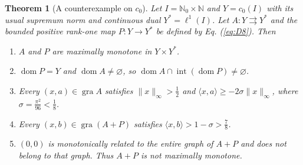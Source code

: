 \documentclass[11pt]{article}
\newcommand{\N}{\mathbb N}
\newcommand{\Nzero}{\mathbb N_0}
\newcommand{\gra}{\operatorname{gra}}
\newcommand{\dom}{\operatorname{dom}}
\newcommand{\pair}[2]{\langle #1,#2\rangle}
\newtheorem{theorem}{Theorem}
\theoremstyle{definition}
\theoremstyle{remark}
\begin{document}
\begin{theorem}[A counterexample on $c_0$]\label{thm:C}
Let $I=\Nzero\times\N$ and $Y=c_0(I)$ with its usual supremum norm and continuous dual $Y^*=\ell^1(I)$. Let $A:Y\rightrightarrows Y^*$ and the bounded positive rank-one map $P:Y\to Y^*$ be defined by Eq. (\ref{eq:D8}). Then 
\begin{enumerate}
\item\label{thm:C-maximality} $A$ and $P$ are maximally monotone in $Y\times Y^*$.
\item\label{thm:C-domain} $\dom P=Y$ and $\dom A\ne\varnothing$, so
$\dom A\cap\operatorname{int}(\dom P)\ne\varnothing$.
\item\label{thm:C-bound} Every $(x,a)\in\gra A$ satisfies $\|x\|_\infty>\frac{1}{2}$ and
$\pair{x}{a}\ge-2\sigma\|x\|_\infty$, where $\sigma=\frac{\pi^2}{96}<\frac{1}{8}$.
\item\label{thm:C-pairing} Every $(x,b)\in\gra(A+P)$ satisfies
$\pair{x}{b}>1-\sigma>\frac{7}{8}$.
\item\label{thm:C-sum} $(0,0)$ is monotonically related to the entire graph of $A+P$ and
does not belong to that graph. Thus $A+P$ is not maximally monotone.
\end{enumerate}
\end{theorem}
\end{document}
